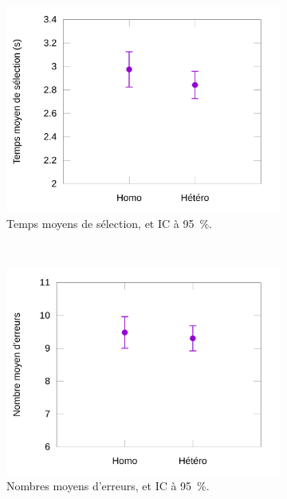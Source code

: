 	\begin{figure}[!htb]
		\begin{subfigure}[t]{0.49\textwidth}
			\centering
			\includegraphics[width=\textwidth]{figures/ch5/timeRes}
			\caption{Temps moyens de sélection, et IC à 95~\%{}.}
			\label{fig:timeRes}
		\end{subfigure}
		~
		\begin{subfigure}[t]{0.49\textwidth}
			\centering
			\includegraphics[width=\textwidth]{figures/ch5/errorRes}
			\caption{Nombres moyens d'erreurs, et IC à 95~\%{}.}
			\label{fig:errorRes}
		\end{subfigure}
		~
		\begin{subfigure}[t]{0.49\textwidth}

\end{subfigure}
\end{figure}
